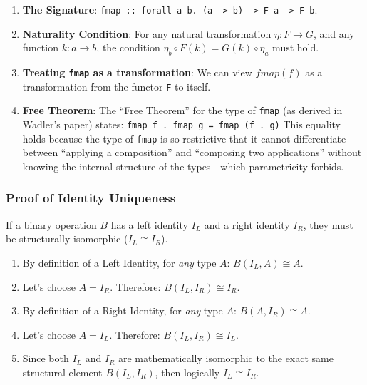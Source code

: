 \documentclass[
]{article}
\providecommand{\tightlist}{%
  \setlength{\itemsep}{0pt}\setlength{\parskip}{0pt}}
\begin{document}
\begin{enumerate}
\def\labelenumi{\arabic{enumi}.}
\tightlist
\item
  \textbf{The Signature}:
  \texttt{fmap\ ::\ forall\ a\ b.\ (a\ -\textgreater{}\ b)\ -\textgreater{}\ F\ a\ -\textgreater{}\ F\ b}.
\item
  \textbf{Naturality Condition}: For any natural transformation
  \(\eta : F \to G\), and any function \(k : a \to b\), the condition
  \(\eta_b \circ F(k) = G(k) \circ \eta_a\) must hold.
\item
  \textbf{Treating \texttt{fmap} as a transformation}: We can view
  \(fmap(f)\) as a transformation from the functor \texttt{F} to itself.
\item
  \textbf{Free Theorem}: The ``Free Theorem'' for the type of
  \texttt{fmap} (as derived in Wadler's paper) states:
  \texttt{fmap\ f\ .\ fmap\ g\ =\ fmap\ (f\ .\ g)} This equality holds
  because the type of \texttt{fmap} is so restrictive that it cannot
  differentiate between ``applying a composition'' and ``composing two
  applications'' without knowing the internal structure of the
  types---which parametricity forbids.
\end{enumerate}

\subsubsection{Proof of Identity
Uniqueness}\label{proof-of-identity-uniqueness}

If a binary operation \(B\) has a left identity \(I_L\) and a right
identity \(I_R\), they must be structurally isomorphic
(\(I_L \cong I_R\)).

\begin{enumerate}
\def\labelenumi{\arabic{enumi}.}
\tightlist
\item
  By definition of a Left Identity, for \emph{any} type \(A\):
  \(B(I_L, A) \cong A\).
\item
  Let's choose \(A = I_R\). Therefore: \(B(I_L, I_R) \cong I_R\).
\item
  By definition of a Right Identity, for \emph{any} type \(A\):
  \(B(A, I_R) \cong A\).
\item
  Let's choose \(A = I_L\). Therefore: \(B(I_L, I_R) \cong I_L\).
\item
  Since both \(I_L\) and \(I_R\) are mathematically isomorphic to the
  exact same structural element \(B(I_L, I_R)\), then logically
  \(I_L \cong I_R\).
\end{enumerate}
\end{document}
